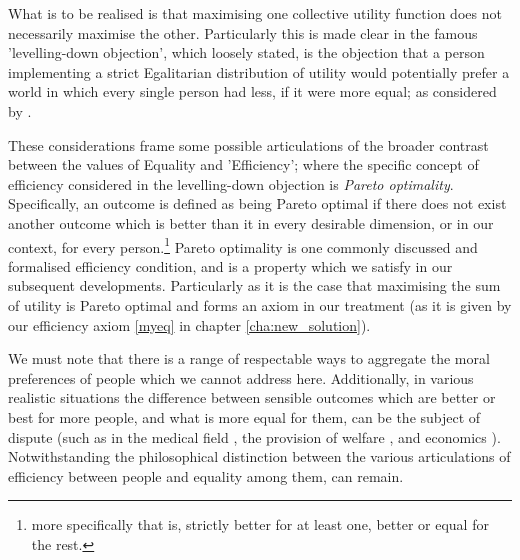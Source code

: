 What is to be realised is that maximising one collective utility function does not necessarily maximise the other.
Particularly this is made clear in the famous 'levelling-down objection', which loosely stated, is the objection that a person implementing a strict Egalitarian distribution of utility would potentially prefer a world in which every single person had less, if it were more equal; as considered by \cite{equalityandpriorityparfit, temkin_2003}.

These considerations frame some possible articulations of the broader contrast between the values of Equality and 'Efficiency'; where the specific concept of efficiency considered in the levelling-down objection is \textit{Pareto optimality}.
Specifically, an outcome is defined as being Pareto optimal if there does not exist another outcome which is better than it in every desirable dimension, or in our context, for every person.\footnote{more specifically that is, strictly better for at least one, better or equal for the rest.}
Pareto optimality is one commonly discussed and formalised efficiency condition, and is a property which we satisfy in our subsequent developments.
Particularly as it is the case that maximising the sum of utility is Pareto optimal and forms an axiom in our treatment (as it is given by our efficiency axiom \eqref{myeq} in chapter \ref{cha:new_solution}).

We must note that there is a range of respectable ways to aggregate the moral preferences of people which we cannot address here.
Additionally, in various realistic situations the difference between sensible outcomes which are better or best for more people, and what is more equal for them, can be the subject of dispute (such as in the medical field \citep{Reidpath2012,RePEc:chy:respap:120cherp}, the provision of welfare \citep{10.2307/27522452}, and economics \citep{10.1093/oep/gpz040}). Notwithstanding the philosophical distinction between the various articulations of efficiency between people and equality among them, can remain.



